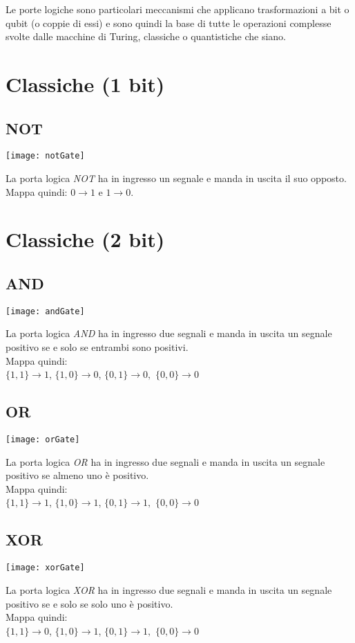 Le porte logiche sono particolari meccanismi che applicano trasformazioni a bit o qubit (o coppie di essi) e sono quindi la base di tutte le operazioni complesse svolte dalle macchine di Turing, classiche o quantistiche che siano.
\section{Classiche (1 bit)}
\subsection{NOT}
\begin{center}
\texttt{[image: notGate]}
\end{center}
La porta logica \textit{NOT} ha in ingresso un segnale e manda in uscita il suo opposto.\\
Mappa quindi:
$0\rightarrow1$ e $1\rightarrow0$.
\section{Classiche (2 bit)}
\subsection{AND}
\begin{center}
\texttt{[image: andGate]}
\end{center}
La porta logica \textit{AND} ha in ingresso due segnali e manda in uscita un segnale positivo se e solo se entrambi sono positivi.\\
Mappa quindi:\\
$\{1,1\}\rightarrow1$, $\{1,0\}\rightarrow0$, $\{0,1\}\rightarrow0,$ $\{0,0\}\rightarrow0$
\subsection{OR}
\begin{center}
\texttt{[image: orGate]}
\end{center}
La porta logica \textit{OR} ha in ingresso due segnali e manda in uscita un segnale positivo se almeno uno è positivo.\\
Mappa quindi:\\
$\{1,1\}\rightarrow1$, $\{1,0\}\rightarrow1$, $\{0,1\}\rightarrow1,$ $\{0,0\}\rightarrow0$
\subsection{XOR}
\begin{center}
\texttt{[image: xorGate]}
\end{center}
La porta logica \textit{XOR} ha in ingresso due segnali e manda in uscita un segnale positivo se e solo se solo uno è positivo.\\
Mappa quindi:\\
$\{1,1\}\rightarrow0$, $\{1,0\}\rightarrow1$, $\{0,1\}\rightarrow1,$ $\{0,0\}\rightarrow0$
